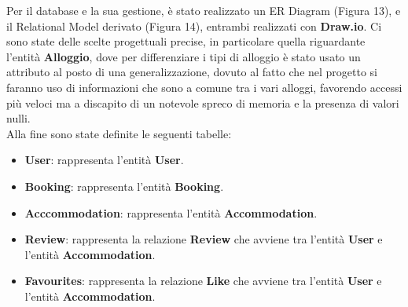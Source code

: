 \documentclass[10pt]{article}
\begin{document}
Per il database e la sua gestione, \`e stato realizzato un ER Diagram (Figura 13), e il Relational Model derivato (Figura 14), entrambi realizzati con \textbf{Draw.io}. Ci sono state delle scelte progettuali precise, in particolare quella riguardante l'entit\`a \textbf{Alloggio}, dove per differenziare i tipi di alloggio è stato usato un attributo al posto di una generalizzazione, dovuto al fatto che nel progetto si faranno uso di informazioni che sono a comune tra i vari alloggi, favorendo accessi più veloci ma a discapito di un notevole spreco di memoria e la presenza di valori nulli.\\
Alla fine sono state definite le seguenti tabelle:
\begin{itemize}
\item \textbf{User}: rappresenta l'entit\`a \textbf{User}.
\item \textbf{Booking}: rappresenta l'entit\`a \textbf{Booking}.
\item \textbf{Acccommodation}: rappresenta l'entit\`a \textbf{Accommodation}.
\item \textbf{Review}: rappresenta la relazione \textbf{Review} che avviene tra l'entit\`a \textbf{User} e l'entit\`a \textbf{Accommodation}.
\item \textbf{Favourites}: rappresenta la relazione \textbf{Like} che avviene tra l'entit\`a \textbf{User} e l'entit\`a \textbf{Accommodation}.
\end{itemize}
\end{document}
